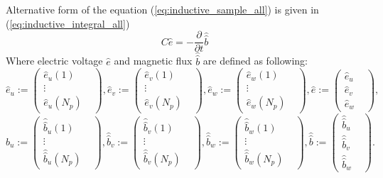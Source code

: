 Alternative form of the equation (\ref{eq:inductive_sample_all}) is given in (\ref{eq:inductive_integral_all})
\begin{equation}
C\widehat{e}=-\frac{\partial}{\partial{t}}\widehat{\widehat{b}}
\label{eq:inductive_integral_all}
\end{equation}
Where electric voltage $\widehat{e}$ and magnetic flux $\widehat{ \widehat{b}}$ are defined as following:
\begin{equation}
\widehat{e}_{u}:=
\begin{pmatrix}
\widehat{e}_{u}(1)&\\
\vdots&\\
\widehat{e}_{u}(N_{p})&
\end{pmatrix},
\widehat{e}_{v}:=
\begin{pmatrix}
\widehat{e}_{v}(1)&\\
\vdots&\\
\widehat{e}_{v}(N_{p})&
\end{pmatrix},
\widehat{e}_{w}:=
\begin{pmatrix}
\widehat{e}_{w}(1)&\\
\vdots&\\
\widehat{e}_{w}(N_{p})&
\end{pmatrix},
\widehat{e}:=
\begin{pmatrix}
\widehat{e}_{u}&\\
\widehat{e}_{v}&\\
\widehat{e}_{w}&
\end{pmatrix},
\label{eq:vector_e_voltage}
\end{equation}
\begin{equation}
\widehat{\widehat{b}}_{u}:=
\begin{pmatrix}
\widehat{\widehat{b}}_{u}(1)&\\
\vdots&\\
\widehat{\widehat{b}}_{u}(N_{p})&
\end{pmatrix},
\widehat{\widehat{b}}_{v}:=
\begin{pmatrix}
\widehat{\widehat{b}}_{v}(1)&\\
\vdots&\\
\widehat{\widehat{b}}_{v}(N_{p})&
\end{pmatrix},
\widehat{\widehat{b}}_{w}:=
\begin{pmatrix}
\widehat{\widehat{b}}_{w}(1)&\\
\vdots&\\
\widehat{\widehat{b}}_{w}(N_{p})&
\end{pmatrix},
\widehat{\widehat{b}}:=
\begin{pmatrix}
\widehat{\widehat{b}}_{u}&\\
\widehat{\widehat{b}}_{v}&\\
\widehat{\widehat{b}}_{w}&
\end{pmatrix}.
\label{eq:vector_m_flux}
\end{equation}
